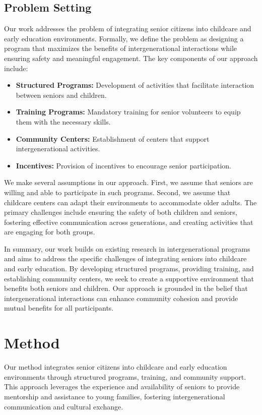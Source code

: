 \documentclass{article} %
\begin{document}
\subsection{Problem Setting}
Our work addresses the problem of integrating senior citizens into childcare and early education environments. Formally, we define the problem as designing a program that maximizes the benefits of intergenerational interactions while ensuring safety and meaningful engagement. The key components of our approach include:
\begin{itemize}
    \item \textbf{Structured Programs:} Development of activities that facilitate interaction between seniors and children.
    \item \textbf{Training Programs:} Mandatory training for senior volunteers to equip them with the necessary skills.
    \item \textbf{Community Centers:} Establishment of centers that support intergenerational activities.
    \item \textbf{Incentives:} Provision of incentives to encourage senior participation.
\end{itemize}

We make several assumptions in our approach. First, we assume that seniors are willing and able to participate in such programs. Second, we assume that childcare centers can adapt their environments to accommodate older adults. The primary challenges include ensuring the safety of both children and seniors, fostering effective communication across generations, and creating activities that are engaging for both groups.

In summary, our work builds on existing research in intergenerational programs and aims to address the specific challenges of integrating seniors into childcare and early education. By developing structured programs, providing training, and establishing community centers, we seek to create a supportive environment that benefits both seniors and children. Our approach is grounded in the belief that intergenerational interactions can enhance community cohesion and provide mutual benefits for all participants.

\section{Method}
\label{sec:method}

Our method integrates senior citizens into childcare and early education environments through structured programs, training, and community support. This approach leverages the experience and availability of seniors to provide mentorship and assistance to young families, fostering intergenerational communication and cultural exchange.
\end{document}
